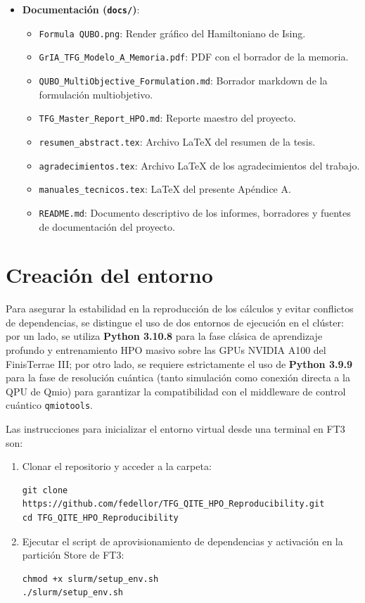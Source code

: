 \begin{itemize}
    \item \textbf{Documentación (\texttt{docs/})}:
    \begin{itemize}
        \item \texttt{Formula QUBO.png}: Render gráfico del Hamiltoniano de Ising.
        \item \texttt{GrIA\_TFG\_Modelo\_A\_Memoria.pdf}: PDF con el borrador de la memoria.
        \item \texttt{QUBO\_MultiObjective\_Formulation.md}: Borrador markdown de la formulación multiobjetivo.
        \item \texttt{TFG\_Master\_Report_HPO.md}: Reporte maestro del proyecto.
        \item \texttt{resumen\_abstract.tex}: Archivo LaTeX del resumen de la tesis.
        \item \texttt{agradecimientos.tex}: Archivo LaTeX de los agradecimientos del trabajo.
        \item \texttt{manuales\_tecnicos.tex}: LaTeX del presente Apéndice A.
        \item \texttt{README.md}: Documento descriptivo de los informes, borradores y fuentes de documentación del proyecto.
    \end{itemize}
\end{itemize}

\section{Creación del entorno}

Para asegurar la estabilidad en la reproducción de los cálculos y evitar conflictos de dependencias, se distingue el uso de dos entornos de ejecución en el clúster: por un lado, se utiliza \textbf{Python 3.10.8} para la fase clásica de aprendizaje profundo y entrenamiento HPO masivo sobre las GPUs NVIDIA A100 del FinisTerrae III; por otro lado, se requiere estrictamente el uso de \textbf{Python 3.9.9} para la fase de resolución cuántica (tanto simulación como conexión directa a la QPU de Qmio) para garantizar la compatibilidad con el middleware de control cuántico \texttt{qmiotools}.

\vspace{0.5cm}
Las instrucciones para inicializar el entorno virtual desde una terminal en FT3 son:

\begin{enumerate}
    \item Clonar el repositorio y acceder a la carpeta:
    \begin{verbatim}
git clone https://github.com/fedellor/TFG_QITE_HPO_Reproducibility.git
cd TFG_QITE_HPO_Reproducibility
    \end{verbatim}
    
    \item Ejecutar el script de aprovisionamiento de dependencias y activación en la partición Store de FT3:
    \begin{verbatim}
chmod +x slurm/setup_env.sh
./slurm/setup_env.sh
    \end{verbatim}
\end{enumerate}

